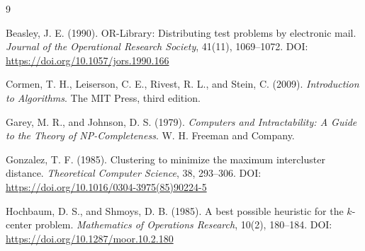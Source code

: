 \documentclass[10pt,twocolumn]{article}
\begin{document}
\begin{thebibliography}{9}

Beasley, J. E. (1990). OR-Library: Distributing test problems by electronic mail.
\textit{Journal of the Operational Research Society}, 41(11), 1069--1072.
DOI: \url{https://doi.org/10.1057/jors.1990.166}

Cormen, T. H., Leiserson, C. E., Rivest, R. L., and Stein, C. (2009).
\textit{Introduction to Algorithms}. The MIT Press, third edition.

Garey, M. R., and Johnson, D. S. (1979). \textit{Computers and Intractability: A Guide
to the Theory of NP-Completeness}. W. H. Freeman and Company.

Gonzalez, T. F. (1985). Clustering to minimize the maximum intercluster distance.
\textit{Theoretical Computer Science}, 38, 293--306.
DOI: \url{https://doi.org/10.1016/0304-3975(85)90224-5}

Hochbaum, D. S., and Shmoys, D. B. (1985). A best possible heuristic for the $k$-center
problem. \textit{Mathematics of Operations Research}, 10(2), 180--184.
DOI: \url{https://doi.org/10.1287/moor.10.2.180}

\end{thebibliography}
\end{document}
